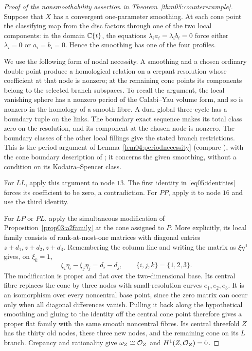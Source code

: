 \begin{proof}[Proof of the nonsmoothability assertion in
Theorem~\ref{thm05:counterexample}]
Suppose that $X$ has a convergent one-parameter smoothing.  At each cone
point the classifying map from the disc factors through one of the two
local components: in the domain $\mathbb{C}\{t\}$, the equations
$\lambda_i a_i=\lambda_i b_i=0$ force either $\lambda_i=0$ or
$a_i=b_i=0$.  Hence the smoothing has one of the four profiles.

We use the following form of nodal necessity.  A smoothing and a chosen
ordinary double point produce a homological relation on a crepant
resolution whose coefficient at that node is nonzero; at the remaining
cone points its components belong to the selected branch subspaces.
To recall the argument, the local vanishing sphere has a nonzero period
of the Calabi--Yau volume form, and so is nonzero in the homology of a
smooth fibre.  A dual global three-cycle has a boundary tuple on the
links.  The boundary exact sequence makes its total class zero on the
resolution, and its component at the chosen node is nonzero.  The
boundary classes of the other local fillings give the stated branch
restrictions.  This is the period argument of
Lemma~\ref{lem04:periodnecessity} (compare \cite[\S1]{RT09}), with the cone
boundary description of \cite[Prop.~2.1 and Lem.~4.2]{PaperIV}; it concerns
the given smoothing, without a condition on its Kodaira--Spencer class.

For $LL$, apply this argument to node $13$.  The first identity in
\eqref{eq05:identities} forces its coefficient to be zero, a contradiction.
For $PP$, apply it to node $16$ and use the third identity.

For $LP$ or $PL$, apply the simultaneous modification of
Proposition~\ref{prop03:a2family} at the cone assigned to $P$.  More
explicitly, its local family consists of rank-at-most-one matrices with
diagonal entries $z+d_1,z+d_2,z+d_3$.  Remembering the column line and
writing the matrix as $\xi\eta^{\mathsf T}$ gives, on $\xi_k=1$,
\[
 \xi_i\eta_i-\xi_j\eta_j=d_i-d_j,
 \qquad \{i,j,k\}=\{1,2,3\}.
\]
The modification is proper and flat over the two-dimensional base.  Its
central fibre replaces the cone by three nodes with small-resolution
curves $e_1,e_2,e_3$.  It is an isomorphism over every noncentral base
point, since the zero matrix can occur only when all diagonal differences
vanish.  Pulling it back along the hypothetical smoothing and gluing to
the identity off the central cone point therefore gives a proper flat
family with the same smooth noncentral fibres.  Its central threefold
$Z$ has the thirty old nodes, these three new nodes, and the remaining
cone on its $L$ branch.  Crepancy and rationality give
$\omega_Z\cong\mathcal{O}_Z$ and $H^1(Z,\mathcal{O}_Z)=0$.


\end{proof}
